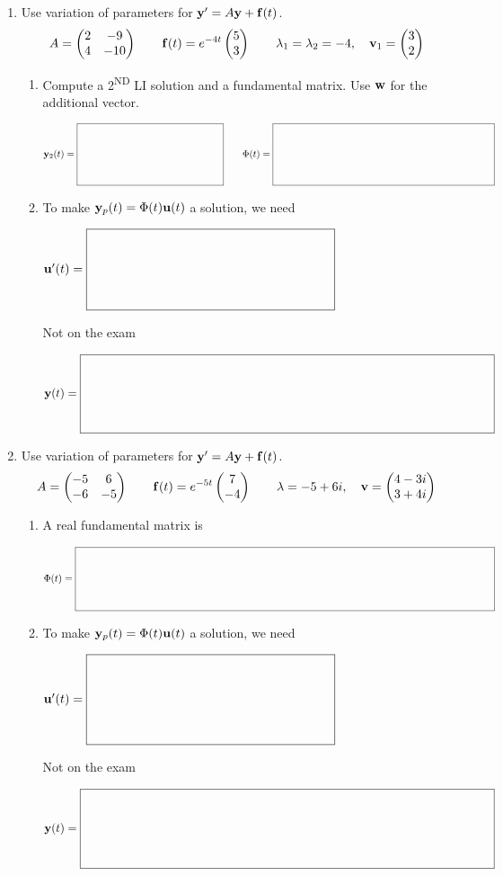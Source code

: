 \documentclass[11pt,letterpaper]{article}
\newcommand{\workbox}[2]{%
  \vcenter{\hbox{$\boxed{\rule{0pt}{#2}\makebox[#1]{}}$}}}
\begin{document}
\begin{enumerate}
\newpage
\item Use variation of parameters for $\mathbf{y}'=A\mathbf{y}+\mathbf{f}(t)$.
\[
A=\begin{pmatrix}2&-9\\4&-10\end{pmatrix}
\qquad
\mathbf{f}(t)=e^{-4t}\begin{pmatrix}5\\3\end{pmatrix}
\qquad
\lambda_1=\lambda_2=-4,\quad
\mathbf{v}_1=\begin{pmatrix}3\\2\end{pmatrix}
\]
\begin{enumerate}
\item Compute a 2\textsuperscript{ND} LI solution and a fundamental matrix. Use $\mathbf{w}$ for the additional vector.
\par $\vect{y}_2(t)=\workbox{2.05in}{0.80in}\qquad\Phi(t)=\workbox{3.15in}{0.80in}$
\item To make $\mathbf{y}_p(t)=\Phi(t)\mathbf{u}(t)$ a solution, we need
\par $\vect{u}'(t)=\workbox{2.65in}{0.80in}
$
\par\vfill
\noindent Not on the exam\par
\noindent $\vect{y}(t)=\workbox{4.85in}{0.85in}$
\end{enumerate}
\item Use variation of parameters for $\mathbf{y}'=A\mathbf{y}+\mathbf{f}(t)$.
\[
A=\begin{pmatrix}-5&6\\-6&-5\end{pmatrix}
\qquad
\mathbf{f}(t)=e^{-5t}\begin{pmatrix}7\\-4\end{pmatrix}
\qquad
\lambda=-5+6i,\quad
\mathbf{v}=\begin{pmatrix}4-3i\\3+4i\end{pmatrix}
\]
\begin{enumerate}
\item A real fundamental matrix is
\par $\Phi(t)=\workbox{5.8in}{0.80in}$
\item To make $\mathbf{y}_p(t)=\Phi(t)\mathbf{u}(t)$ a solution, we need
\par $\vect{u}'(t)=\workbox{2.65in}{0.90in}
$
\par\vfill
\noindent Not on the exam\par
\noindent $\vect{y}(t)=\workbox{4.85in}{0.85in}$
\end{enumerate}
\end{enumerate}
\end{document}
